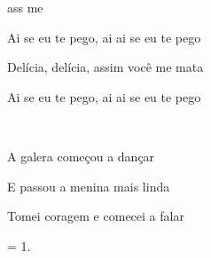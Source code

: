 
\zr

 
ass me 

Ai se eu te pego,
ai ai se eu te pego

Delícia, delícia,
assim você me mata

Ai se eu te pego,
ai ai se eu te pego
\kr


    ~   

\zs
{} 

A galera começou a dançar

E passou a menina mais linda

Tomei coragem e comecei a falar
\ks

\zr \kr

\zs
= 1.
\ks

\zr \kr

\zr \kr

\kp


